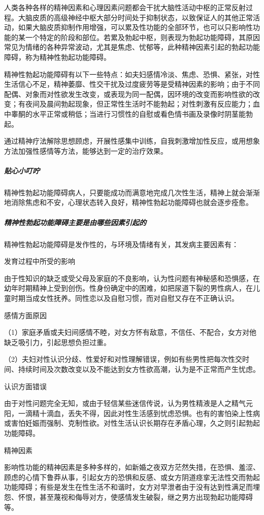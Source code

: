 人类各种各样的精神因素和心理因素问题都会干扰大脑性活动中枢的正常反射过程。大脑皮质的高级神经中枢大部分时间处于抑制状态，以致保证人的其他正常活动，如果大脑皮质抑制作用增强，可以累及性功能的全部环节，也可以只影响性功能的某一个特定的阶段和部位。若累及勃起中枢，则表现为勃起功能障碍，其原因常见为情绪的各种异常波动，尤其是焦虑、忧郁等，此种精神因素引起的勃起功能障碍，称为精神性勃起功能障碍。

精神性勃起功能障碍有以下一些特点：如夫妇感情冷淡、焦虑、恐惧、紧张，对性生活信心不足，精神萎靡、性交干扰及过度疲劳等是受精神因素的影响；由于不同配偶、对象而对性欲发生改变，或表现为同一配偶，因环境的改变而影响性欲的改变；有夜间及晨间勃起现象，但正常性生活时不能勃起；对性刺激有反应能力；血中睾酮的水平正常或稍低；当进行习惯性的自慰或看色情书画及录像时阴茎能勃起。

通过精神疗法解除思想顾虑，开展性感集中训练，自我刺激增加性反应，或用想象方法加强性感情等方法，能够达到一定的治疗效果。

\subparagraph{贴心小叮咛}

精神性勃起功能障碍病人，只要能成功而满意地完成几次性生活，精神上就会渐渐地消除焦虑和不安，心理状态转入良好，精神性勃起功能障碍也就会逐步痊愈。

\subparagraph{精神性勃起功能障碍主要是由哪些因素引起的}

精神性勃起功能障碍是发作性的，与环境及情绪有关，其发病主要因素有：

发育过程中所受的影响

由于性知识的缺乏或受父母及家庭的不良影响，认为性问题有神秘感和恐惧感，在幼年时期精神上受到创伤。性身份确定中的困难，如把尿道下裂的男性病人，在儿童时期当成女性抚养。同性恋以及自慰习惯，而对自慰又存在不正确认识。

感情方面原因

（1）家庭矛盾或夫妇间感情不睦，对女方怀有敌意，不信任、不配合，女方对他缺乏吸引力，引起思想负担过重。

（2）夫妇对性认识分歧、性爱好和对性理解错误，例如有些男性把每次性交时间、持续时间及次数改变以及不能达到女方性欲高潮，认为是不正常而产生忧虑。

认识方面错误

由于对性问题完全无知，或由于轻信某些迷信传说，认为男性精液是人之精气元阳，一滴精十滴血，丢失不得，因此对性生活感到忧虑恐惧。也有的害怕染上性病或害怕妊娠而强制、克制性欲。对性生活认识长期存在矛盾心理，久之则引起勃起功能障碍。

精神因素

影响性功能的精神因素是多种多样的，如新婚之夜双方茫然失措，在恐惧、羞涩、顾虑的心情下鲁莽从事，引起女方的恐惧和反感、或女方阴道痉挛无法性交而勃起功能障碍；有些是发生在性生活不和谐时，女方对早泄者由于没有达到性满足而埋怨、怀恨，甚至蔑视和侮辱对方，使感情发生破裂，继之男方出现勃起功能障碍等。

